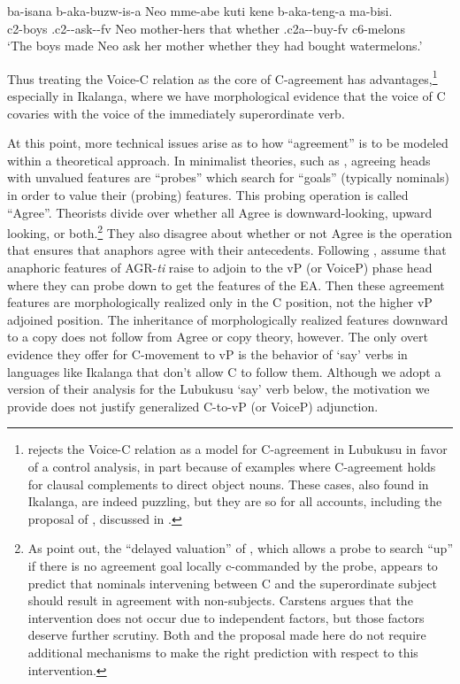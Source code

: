 \documentclass[output=paper,
modfonts
]{langscibook}
\begin{document}
\ea\label{n30} \gll ba-isana	b-aka-buzw-is-a			Neo	mme-abe	kuti	kene b-aka-teng-a		ma-bisi.\\
       c2-boys	.c2--ask--fv	Neo	mother-hers	that whether .c2a--buy-fv	c6-melons\\
    \glt `The boys made Neo ask her mother whether they had bought watermelons.' \z 

Thus treating the Voice-C relation as the core of C-agreement has advantages,\footnote{\citet[367--369]{Diercks2010} rejects the Voice-C relation as a model for C-agreement in Lubukusu in favor of a control analysis, in part because of examples where C-agreement holds for clausal complements to direct object nouns. These cases, also found in Ikalanga, are indeed puzzling, but they are so for all accounts, including the proposal of \citet{Diercks2017a}, discussed in .}  especially in Ikalanga, where we have morphological evidence that the voice of C covaries with the voice of the immediately superordinate verb.

At this point, more technical issues arise as to how ``agreement'' is to be modeled within a theoretical approach. In minimalist theories, such as \citet{Chomsky2001}, 
agreeing heads with unvalued features are ``probes'' which search for ``goals'' (typically nominals) in order to value their (probing) features. This probing operation is called ``Agree''. Theorists divide over whether all Agree is downward-looking, upward looking, or both.\footnote{As \cite{Diercks2017a} point out, the ``delayed valuation'' of \citet{Carstens2016}, which allows a probe to search ``up'' if there is no agreement goal locally c-commanded by the probe, appears to predict that nominals intervening between C and the superordinate subject should result in agreement with non-subjects. Carstens argues that the intervention does not occur due to independent factors, but those factors deserve further scrutiny. Both \citeauthor{Diercks2017a} and the proposal made here do not require additional mechanisms to make the right prediction with respect to this intervention.} They also disagree about whether or not Agree is the operation that ensures that anaphors agree with their antecedents. Following \citet{Rooryck2011}, \citet{Diercks2017a} assume that anaphoric features of AGR-\textit{ti} raise to adjoin to the vP (or VoiceP) phase head where they can probe down to get the features of the EA. Then these agreement features are morphologically realized only in the C position, not the higher vP adjoined position. The inheritance of morphologically realized features downward to a copy does not follow from Agree or copy theory, however. The only overt evidence they offer for C-movement to vP is the behavior of `say' verbs in languages like Ikalanga that don’t allow C to follow them. Although we adopt a version of their analysis for the Lubukusu `say' verb below, the motivation we provide does not justify generalized C-to-vP (or VoiceP) adjunction.
\end{document}
